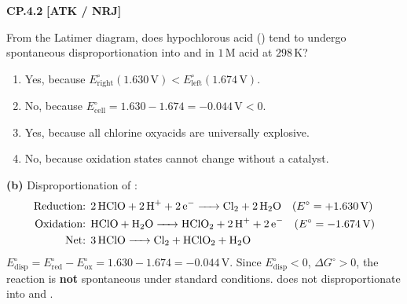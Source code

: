 \begin{problembox}
\textbf{CP.4.2} \hfill \textbf{[ATK / NRJ]}

From the Latimer diagram, does hypochlorous acid () tend to undergo spontaneous disproportionation into  and  in $1\,\text{M}$ acid at $298\,\text{K}$?
\begin{enumerate}[label=(\alph*)]
    \item Yes, because $E^\circ_{\text{right}} (1.630\,\text{V}) < E^\circ_{\text{left}} (1.674\,\text{V})$.
    \item No, because $E^\circ_{\text{cell}} = 1.630 - 1.674 = -0.044\,\text{V} < 0$.
    \item Yes, because all chlorine oxyacids are universally explosive.
    \item No, because oxidation states cannot change without a catalyst.
\end{enumerate}
\end{problembox}
\begin{solution}
\textbf{(b)}
Disproportionation of :
\begin{align*}
    \text{Reduction: } & \ce{2HClO + 2H+ + 2e^- -> Cl2 + 2H2O} \quad (E^\circ = +1.630\,\text{V}) \\
    \text{Oxidation: } & \ce{HClO + H2O -> HClO2 + 2H+ + 2e^-} \quad (E^\circ = -1.674\,\text{V}) \\
    \text{Net: } & \ce{3HClO -> Cl2 + HClO2 + H2O}
\end{align*}
$E^\circ_{\text{disp}} = E^\circ_{\text{red}} - E^\circ_{\text{ox}} = 1.630 - 1.674 = -0.044\,\text{V}$.
Since $E^\circ_{\text{disp}} < 0$, $\Delta G^\circ > 0$, the reaction is \textbf{not} spontaneous under standard conditions.  does not disproportionate into  and .
\end{solution}

